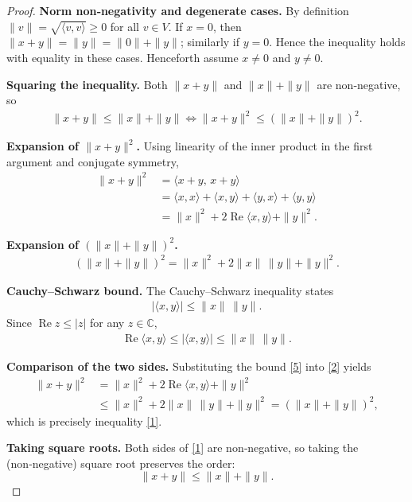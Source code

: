 \begin{proof}
\textbf{Norm non‑negativity and degenerate cases.}  
By definition $\|v\|=\sqrt{\langle v,v\rangle}\ge 0$ for all $v\in V$.  
If $x=0$, then $\|x+y\|=\|y\|=\|0\|+\|y\|$; similarly if $y=0$. Hence the inequality holds with equality in these cases.  
Henceforth assume $x\neq0$ and $y\neq0$.

\textbf{Squaring the inequality.}  
Both $\|x+y\|$ and $\|x\|+\|y\|$ are non‑negative, so
\begin{align}
\|x+y\|\le\|x\|+\|y\|
\iff
\|x+y\|^{2}\le(\|x\|+\|y\|)^{2}.
\tag{1}
\end{align}

\textbf{Expansion of $\|x+y\|^{2}$.}  
Using linearity of the inner product in the first argument and conjugate symmetry,
\begin{align}
\|x+y\|^{2}
&=\langle x+y,\,x+y\rangle \\
&=\langle x,x\rangle+\langle x,y\rangle+\langle y,x\rangle+\langle y,y\rangle \\
&=\|x\|^{2}+2\operatorname{Re}\langle x,y\rangle+\|y\|^{2}.
\tag{2}
\end{align}

\textbf{Expansion of $(\|x\|+\|y\|)^{2}$.}
\begin{align}
(\|x\|+\|y\|)^{2}= \|x\|^{2}+2\|x\|\,\|y\|+\|y\|^{2}.
\tag{3}
\end{align}

\textbf{Cauchy–Schwarz bound.}  
The Cauchy–Schwarz inequality states
\begin{align}
|\langle x,y\rangle|\le \|x\|\,\|y\|.
\tag{4}
\end{align}
Since $\operatorname{Re}z\le|z|$ for any $z\in\mathbb{C}$,
\begin{align}
\operatorname{Re}\langle x,y\rangle\le |\langle x,y\rangle|
\le \|x\|\,\|y\|.
\tag{5}
\end{align}

\textbf{Comparison of the two sides.}  
Substituting the bound \eqref{5} into \eqref{2} yields
\begin{align}
\|x+y\|^{2}
&=\|x\|^{2}+2\operatorname{Re}\langle x,y\rangle+\|y\|^{2} \\
&\le\|x\|^{2}+2\|x\|\,\|y\|+\|y\|^{2}
=(\|x\|+\|y\|)^{2},
\end{align}
which is precisely inequality \eqref{1}.

\textbf{Taking square roots.}  
Both sides of \eqref{1} are non‑negative, so taking the (non‑negative) square root preserves the order:
\[
\|x+y\|\le\|x\|+\|y\|.
\]


\end{proof}
